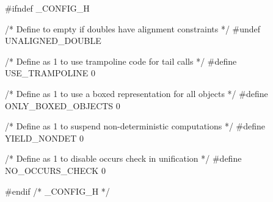 \nwenddocs{}\endmoddef\nwstartdeflinemarkup\nwenddeflinemarkup
#ifndef _CONFIG_H

/* Define to empty if doubles have alignment constraints */
#undef UNALIGNED_DOUBLE

/* Define as 1 to use trampoline code for tail calls */
#define USE_TRAMPOLINE 0

/* Define as 1 to use a boxed representation for all objects */
#define ONLY_BOXED_OBJECTS 0

/* Define as 1 to suspend non-deterministic computations */
#define YIELD_NONDET 0

/* Define as 1 to disable occurs check in unification */
#define NO_OCCURS_CHECK 0

#endif /* _CONFIG_H */
\nwendcode{}

%
%

